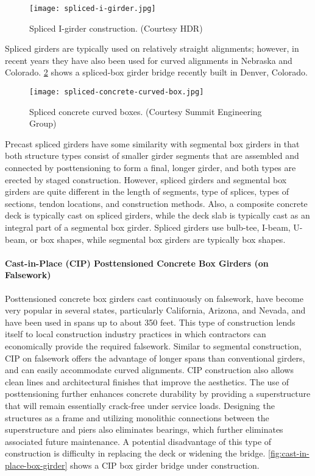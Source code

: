 \begin{figure}
  \texttt{[image: spliced-i-girder.jpg]}
  \caption{Spliced I-girder construction. (Courtesy HDR)}\label{fig:spliced-i-girder}
\end{figure}


Spliced girders are typically used on relatively straight alignments; however, in recent years they have also been
used for curved alignments in Nebraska and Colorado. \cref{fig:spliced-concrete-curved-box} shows a spliced-box girder bridge recently built
in Denver, Colorado.

\begin{figure}
  \texttt{[image: spliced-concrete-curved-box.jpg]}
  \caption{Spliced concrete curved boxes. (Courtesy Summit Engineering Group)}
  \label{fig:spliced-concrete-curved-box}
\end{figure}

Precast spliced girders have some similarity with segmental box girders in that both structure types consist of
smaller girder segments that are assembled and connected by posttensioning to form a final, longer girder, and both
types are erected by staged construction. However, spliced girders and segmental box girders are quite different in
the length of segments, type of splices, types of sections, tendon locations, and construction methods. Also, a
composite concrete deck is typically cast on spliced girders, while the deck slab is typically cast as an integral part of
a segmental box girder. Spliced girders use bulb-tee, I-beam, U-beam, or box shapes, while segmental box girders are
typically box shapes.



\paragraph{Cast-in-Place (CIP) Posttensioned Concrete Box Girders (on Falsework)}

Posttensioned concrete box girders cast continuously on falsework, have become very popular in several states,
particularly California, Arizona, and Nevada, and have been used in spans up to about 350 feet. This type of
construction lends itself to local construction industry practices in which contractors can economically provide the
required falsework. Similar to segmental construction, CIP on falsework offers the advantage of longer spans than
conventional girders, and can easily accommodate curved alignments. CIP construction also allows clean lines and
architectural finishes that improve the aesthetics. The use of posttensioning further enhances concrete durability by
providing a superstructure that will remain essentially crack-free under service loads. Designing the structures as a
frame and utilizing monolithic connections between the superstructure and piers also eliminates bearings, which
further eliminates associated future maintenance. A potential disadvantage of this type of construction is difficulty in
replacing the deck or widening the bridge. \cref{fig:cast-in-place-box-girder} shows a CIP box girder bridge under construction.

